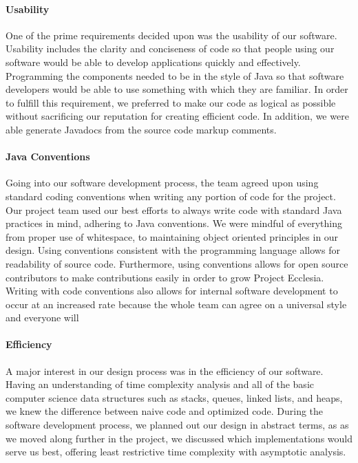 \documentclass[letterpaper, 10pt]{article}
\begin{document}
		\paragraph{Usability}
		One of the prime requirements decided upon was the usability of our software. Usability includes the clarity and conciseness of code so that people using our software would be able to develop applications quickly and effectively. Programming the components needed to be in the style of Java so that software developers would be able to use something with which they are familiar. In order to fulfill this requirement, we preferred to make our code as logical as possible without sacrificing our reputation for creating efficient code. In addition, we were able generate Javadocs from the source code markup comments.
		
		\paragraph{Java Conventions}
		Going into our software development process, the team agreed upon using standard coding conventions when writing any portion of code for the project. Our project team used our best efforts to always write code with standard Java practices in mind, adhering to Java conventions. We were mindful of everything from proper use of whitespace, to maintaining object oriented principles in our design. Using conventions consistent with the programming language allows for readability of source code. Furthermore, using conventions allows for open source contributors to make contributions easily in order to grow Project Ecclesia. Writing with code conventions also allows for internal software development to occur at an increased rate because the whole team can agree on a universal style and everyone will
		
		\paragraph{Efficiency} 
		A major interest in our design process was in the efficiency of our software. Having an understanding of time complexity analysis and all of the basic computer science data structures such as stacks, queues, linked lists, and heaps, we knew the difference between naive code and optimized code. During the software development process, we planned out our design in abstract terms, as as we moved along further in the project, we discussed which implementations would serve us best, offering least restrictive time complexity with asymptotic analysis.	
	
\end{document}
